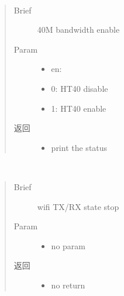 \documentclass[letterpaper,10pt,english]{sphinxhowto}
\begin{document}
\begin{fulllineitems}
\begin{fulllineitems}
\end{fulllineitems}


\begin{fulllineitems}
\label{\detokenize{rfapi/index:wifi_api.WIFIAPI.cbw40m_en}}~\begin{quote}\begin{description}
\item[{Brief}] \leavevmode
40M bandwidth enable

\item[{Param}] \leavevmode\begin{itemize}
\item {} 
en:

\item {} 
0: HT40 disable

\item {} 
1: HT40 enable

\end{itemize}

\item[{返回}] \leavevmode
\begin{itemize}
\item {} 
print the status

\end{itemize}


\end{description}\end{quote}

\end{fulllineitems}


\begin{fulllineitems}
\label{\detokenize{rfapi/index:wifi_api.WIFIAPI.cmdstop}}~\begin{quote}\begin{description}
\item[{Brief}] \leavevmode
wifi TX/RX state stop

\item[{Param}] \leavevmode\begin{itemize}
\item {} 
no param

\end{itemize}

\item[{返回}] \leavevmode
\begin{itemize}
\item {} 
no return


\end{itemize}
\end{description}
\end{quote}
\end{fulllineitems}
\end{fulllineitems}
\end{document}
